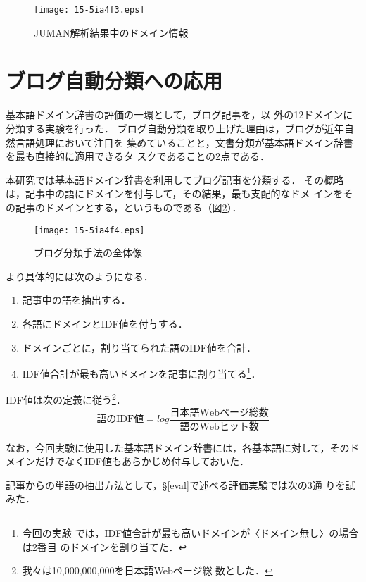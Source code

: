 \documentclass[japanese]{jnlp_1.4}
\newcommand{\dom}[1]{}
\begin{document}
\begin{figure}[t]
\texttt{[image: 15-5ia4f3.eps]}
\caption{JUMAN解析結果中のドメイン情報}
\label{juman-pic}
\end{figure}


\section{ブログ自動分類への応用 \label{bunrui-method}}

基本語ドメイン辞書の評価の一環として，ブログ記事を，\dom{ドメイン無し}以
外の12ドメインに分類する実験を行った．
ブログ自動分類を取り上げた理由は，ブログが近年自然言語処理において注目を
集めていることと，文書分類が基本語ドメイン辞書を最も直接的に適用できるタ
スクであることの2点である．

本研究では基本語ドメイン辞書を利用してブログ記事を分類する．
その概略は，記事中の語にドメインを付与して，その結果，最も支配的なドメ
インをその記事のドメインとする，というものである（図\ref{bunrui-syuhou}）．


\begin{figure}[t]
\begin{center}
\texttt{[image: 15-5ia4f4.eps]}
\end{center}
\caption{ブログ分類手法の全体像}
\label{bunrui-syuhou}
\end{figure}

より具体的には次のようになる．

\begin{enumerate}
 \item 記事中の語を抽出する．
 \item 各語にドメインとIDF値を付与する．
 \item ドメインごとに，割り当てられた語のIDF値を合計．
 \item IDF値合計が最も高いドメインを記事に割り当てる\footnote{今回の実験
       では，IDF値合計が最も高いドメインが〈ドメイン無し〉の場合は2番目
       のドメインを割り当てた．}．
\end{enumerate}

IDF値は次の定義に従う\footnote{我々は10,000,000,000を日本語Webページ総
数とした．}．
$$\textrm{語のIDF値}=log\frac{\textrm{日本語Webページ総数}}
{\textrm{語のWebヒット数}}$$

なお，今回実験に使用した基本語ドメイン辞書には，各基本語に対して，そのド
メインだけでなくIDF値もあらかじめ付与しておいた．

記事からの単語の抽出方法として，\S\ref{eval}で述べる評価実験では次の3通
りを試みた．
\end{document}
